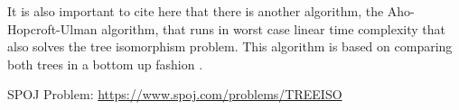 It is also important to cite here that there is another algorithm, the Aho-Hopcroft-Ulman algorithm, that runs in worst case linear time complexity that also solves the tree isomorphism problem. This algorithm is based on comparing both trees in a bottom up fashion \cite{AHU}.

SPOJ Problem: \url{https://www.spoj.com/problems/TREEISO}

